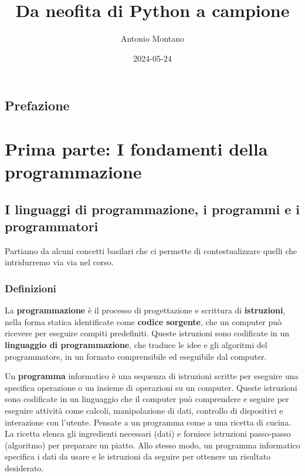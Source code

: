 \documentclass[
  letterpaper,
]{scrbook}
\title{Da neofita di Python a campione}
\author{Antonio Montano}
\date{2024-05-24}
\renewcommand*\contentsname{Indice}
\newcommand\contentsname{Indice}
\begin{document}
\frontmatter
\maketitle

\renewcommand*\contentsname{Indice}
{
\setcounter{tocdepth}{2}
\tableofcontents
}
\mainmatter
{}

\chapter*{Prefazione}\label{prefazione}


\part{Prima parte: I fondamenti della programmazione}

\chapter{I linguaggi di programmazione, i programmi e i
programmatori}\label{i-linguaggi-di-programmazione-i-programmi-e-i-programmatori}

Partiamo da alcuni concetti basilari che ci permette di contestualizzare
quelli che intridurremo via via nel corso.

\section{Definizioni}\label{definizioni}

La \textbf{programmazione} è il processo di progettazione e scrittura di
\textbf{istruzioni}, nella forma statica identificate come
\textbf{codice sorgente}, che un computer può ricevere per eseguire
compiti predefiniti. Queste istruzioni sono codificate in un
\textbf{linguaggio di programmazione}, che traduce le idee e gli
algoritmi del programmatore, in un formato comprensibile ed eseguibile
dal computer.

Un \textbf{programma} informatico è una sequenza di istruzioni scritte
per eseguire una specifica operazione o un insieme di operazioni su un
computer. Queste istruzioni sono codificate in un linguaggio che il
computer può comprendere e seguire per eseguire attività come calcoli,
manipolazione di dati, controllo di dispositivi e interazione con
l'utente. Pensate a un programma come a una ricetta di cucina. La
ricetta elenca gli ingredienti necessari (dati) e fornisce istruzioni
passo-passo (algoritmo) per preparare un piatto. Allo stesso modo, un
programma informatico specifica i dati da usare e le istruzioni da
seguire per ottenere un risultato desiderato.
\end{document}
